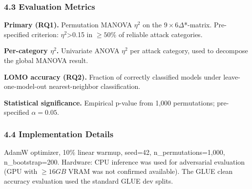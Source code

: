 \subsubsection{4.3 Evaluation Metrics}

\textbf{Primary (RQ1).} Permutation MANOVA $\eta^2$ on the $9\times 6 \Delta$*-matrix. Pre-specified criterion: $\eta^2$>0.15 in $\geq 50$\% of reliable attack categories.

\textbf{Per-category $\eta^2$.} Univariate ANOVA $\eta^2$ per attack category, used to decompose the global MANOVA result.

\textbf{LOMO accuracy (RQ2).} Fraction of correctly classified models under leave-one-model-out nearest-neighbor classification.

\textbf{Statistical significance.} Empirical p-value from 1,000 permutations; pre-specified $\alpha =0.05$.

\subsubsection{4.4 Implementation Details}

AdamW optimizer, 10\% linear warmup, seed=42, n\_permutations=1,000, n\_bootstrap=200. Hardware: CPU inference was used for adversarial evaluation (GPU with $\geq 16GB$ VRAM was not confirmed available). The GLUE clean accuracy evaluation used the standard GLUE dev splits.

